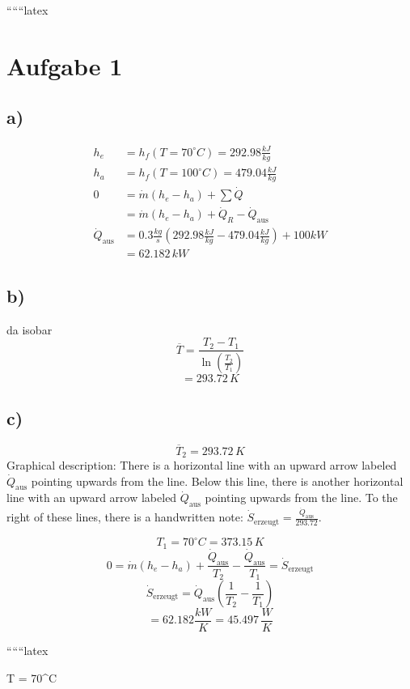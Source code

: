
``````latex


\section*{Aufgabe 1}

\subsection*{a)}
\begin{align*}
    h_e &= h_f(T = 70^\circ C) = 292.98 \frac{kJ}{kg} \\
    h_a &= h_f(T = 100^\circ C) = 479.04 \frac{kJ}{kg} \\
    0 &= \dot{m}(h_e - h_a) + \sum \dot{Q} \\
    &= \dot{m}(h_e - h_a) + \dot{Q}_R - \dot{Q}_{\text{aus}} \\
    \dot{Q}_{\text{aus}} &= 0.3 \frac{kg}{s} (292.98 \frac{kJ}{kg} - 479.04 \frac{kJ}{kg}) + 100 kW \\
    &= \boxed{62.182 \, kW}
\end{align*}

\subsection*{b)}
da isobar
\[
\overline{T} = \frac{T_2 - T_1}{\ln(\frac{T_2}{T_1})}
\]
\[
= \boxed{293.72 \, K}
\]

\subsection*{c)}
\[
\overline{T}_2 = 293.72 \, K
\]
Graphical description: There is a horizontal line with an upward arrow labeled $\dot{Q}_{\text{aus}}$ pointing upwards from the line. Below this line, there is another horizontal line with an upward arrow labeled $\dot{Q}_{\text{aus}}$ pointing upwards from the line. To the right of these lines, there is a handwritten note: $\dot{S}_{\text{erzeugt}} = \frac{\dot{Q}_{\text{aus}}}{293.72}$.

\[
T_1 = 70^\circ C = 373.15 \, K
\]
\[
0 = \dot{m}(h_e - h_a) + \frac{\dot{Q}_{\text{aus}}}{T_2} - \frac{\dot{Q}_{\text{aus}}}{T_1} = \dot{S}_{\text{erzeugt}}
\]
\[
\dot{S}_{\text{erzeugt}} = \dot{Q}_{\text{aus}} \left( \frac{1}{T_2} - \frac{1}{T_1} \right)
\]
\[
= 62.182 \frac{kW}{K} = \boxed{45.497 \, \frac{W}{K}}
\]

``````latex


T = 70^\circ C

